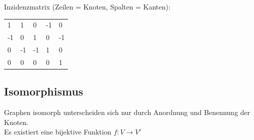 \documentclass[8pt,landscape]{scrartcl}
\begin{document}
\begin{multicols}{3}
Inzidenzmatrix (Zeilen = Knoten, Spalten = Kanten):\\
\begin{tabular}{lllll}
1 & 1 & 0 & -1 & 0\\
-1 & 0 & 1 & 0 & -1\\
0 & -1 & -1 & 1 & 0\\
0 & 0 & 0 & 0 & 1
\end{tabular}

\subsection{Isomorphismus}
Graphen isomorph unterscheiden sich nur durch Anordnung und Benennung der Knoten.\\
Es existiert eine bijektive Funktion $f: V \rightarrow V'$




\end{multicols}
\end{document}
